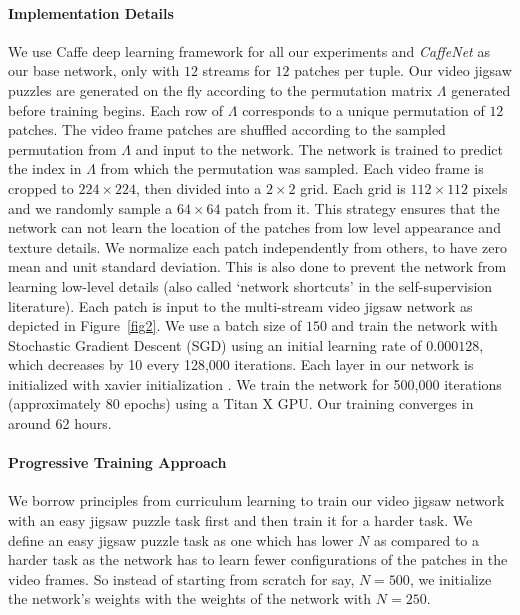 \documentclass[10pt,twocolumn,letterpaper]{article}
\begin{document}
\paragraph{\textbf{Implementation Details}}
We use Caffe \cite{jia2014caffe} deep learning framework for all our experiments and \textit{CaffeNet} \cite{krizhevsky2012imagenet} as our base network, only with $12$ streams for $12$ patches per tuple. Our video jigsaw puzzles are generated on the fly according to the permutation matrix $\Lambda$ generated before training begins. Each row of $\Lambda$ corresponds to a unique permutation of $12$ patches. The video frame patches are shuffled according to the sampled permutation from $\Lambda$ and input to the network. The network is trained to predict the index in $\Lambda$ from which the permutation was sampled. Each video frame is cropped to $224\times224$, then divided into a $2\times2$ grid. Each grid is $112\times112$ pixels and we randomly sample a $64\times64$ patch from it. This strategy ensures that the network can not learn the location of the patches from low level appearance and texture details. We normalize each patch independently from others, to have zero mean and unit standard deviation. This is also done to prevent the network from learning low-level details (also called `network shortcuts' in the self-supervision literature). Each patch is input to the multi-stream video jigsaw network as depicted in Figure~\ref{fig2}. We use a batch size of $150$ and train the network with Stochastic Gradient Descent (SGD) using an initial learning rate of $0.000128$, which decreases by 10 every 128,000 iterations. Each layer in our network is initialized with xavier initialization \cite{glorot2010understanding}. We train the network for 500,000 iterations (approximately 80 epochs) using a Titan X GPU. Our training converges in around 62 hours.  
\vspace{-3mm}
\paragraph{\textbf{Progressive Training Approach}}
We borrow principles from curriculum  learning \cite{bengio2009curriculum} to train our video jigsaw network with an easy jigsaw puzzle task first and then train it for a harder task. We define an easy jigsaw puzzle task as one which has lower $N$ as compared to a harder task as the network has to learn fewer configurations of the patches in the video frames. So instead of starting from scratch for say, $N = 500$, we initialize the network's weights with the weights of the network with $N = 250$. 
\end{document}
